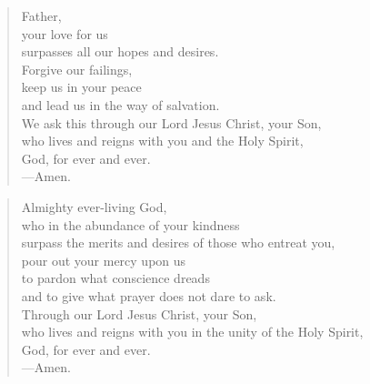 \prayer

\setlength{\leftmargini}{\prayerleftmargini}

\begin{verse}
Father,\\
your love for us\\
surpasses all our hopes and desires.\\
Forgive our failings,\\
keep us in your peace\\
and lead us in the way of salvation.\\
We ask this through our Lord Jesus Christ, your Son,\\
who lives and reigns with you and the Holy Spirit,\\
God, for ever and ever.\\
{\color{red}---\thinspace}Amen.
\end{verse}


\begin{verse}
Almighty ever-living God,\\
who in the abundance of your kindness\\
surpass the merits and desires of those who entreat you,\\
pour out your mercy upon us\\
to pardon what conscience dreads\\
and to give what prayer does not dare to ask.\\
Through our Lord Jesus Christ, your Son,\\
who lives and reigns with you in the unity of the Holy Spirit,\\
God, for ever and ever.\\
{\color{red}---\thinspace}Amen.
\end{verse}

\setlength{\leftmargini}{\defleftmargini}